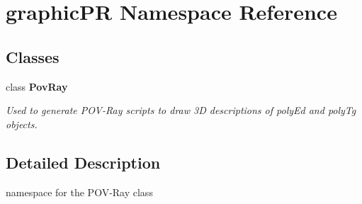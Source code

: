 \section{graphic\+PR Namespace Reference}
\label{namespacegraphic_p_r}
\subsection*{Classes}
\begin{DoxyCompactItemize}
\item 
class \textbf{ Pov\+Ray}
\begin{DoxyCompactList}\small\item\em Used to generate P\+O\+V-\/\+Ray scripts to draw 3D descriptions of poly\+Ed and poly\+Tg objects. \end{DoxyCompactList}\end{DoxyCompactItemize}


\subsection{Detailed Description}
namespace for the P\+O\+V-\/\+Ray class 